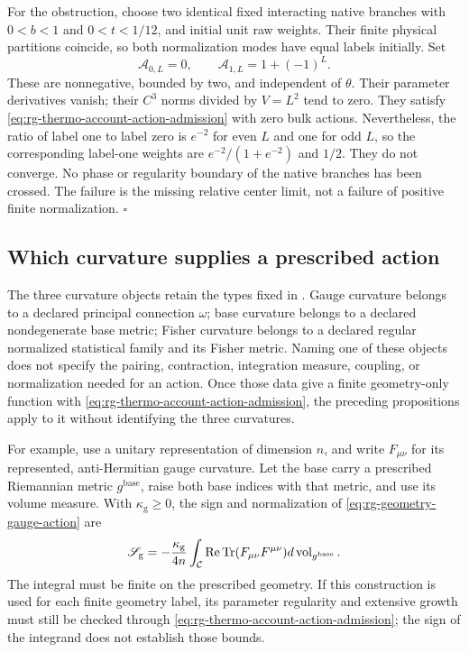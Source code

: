 For the obstruction, choose two identical fixed interacting native
branches with $0<b<1$ and $0<t<1/12$, and initial unit raw weights.
Their finite physical partitions coincide, so both normalization modes
have equal labels initially. Set
\begin{equation}
 \mathscr A_{0,L}=0,\qquad
 \mathscr A_{1,L}=1+(-1)^L.
 \label{eq:rg-thermo-account-alternating-action}
\end{equation}
These are nonnegative, bounded by two, and independent of $\theta$.
Their parameter derivatives vanish; their $C^3$ norms divided by
$V=L^2$ tend to zero. They satisfy
\cref{eq:rg-thermo-account-action-admission} with zero bulk actions.
Nevertheless, the ratio of label one to label zero is $e^{-2}$ for even
$L$ and one for odd $L$, so the corresponding label-one weights are
$e^{-2}/(1+e^{-2})$ and $1/2$. They do not converge. No phase or
regularity boundary of the native branches has been crossed. The failure
is the missing relative center limit, not a failure of positive finite
normalization. $\square$

\subsection{Which curvature supplies a prescribed action}
\label{sec:rg-thermo-account-curvature-types}

The three curvature objects retain the types fixed in
. Gauge curvature belongs to a
declared principal connection $\omega$; base curvature belongs to a
declared nondegenerate base metric; Fisher curvature belongs to a declared
regular normalized statistical family and its Fisher metric. Naming one
of these objects does not specify the pairing, contraction, integration
measure, coupling, or normalization needed for an action. Once those
data give a finite geometry-only function with
\cref{eq:rg-thermo-account-action-admission}, the preceding propositions
apply to it without identifying the three curvatures.\thermoestablishedstatus


For example, use a unitary representation of dimension $n$, and write
$F_{\mu\nu}$ for its represented, anti-Hermitian gauge curvature.
Let the base carry a prescribed Riemannian metric
$g^{\mathrm{base}}$, raise both base indices with that metric, and use
its volume measure. With $\kappa_{\mathrm g}\geq0$, the sign and
normalization of \cref{eq:rg-geometry-gauge-action} are
\begin{equation}
 \mathscr S_{\mathrm g}
 =-\frac{\kappa_{\mathrm g}}{4n}
   \int_{\mathcal C}
       \operatorname{Re}\operatorname{Tr}(F_{\mu\nu}F^{\mu\nu})
                     d\operatorname{vol}_{g^{\mathrm{base}}}.
 \label{eq:rg-thermo-account-unitary-action}
\end{equation}
The integral must be finite on the prescribed geometry. If this
construction is used for each finite geometry label, its parameter
regularity and extensive growth must still be checked through
\cref{eq:rg-thermo-account-action-admission}; the sign of the
integrand does not establish those bounds.\thermoestablishedstatus

